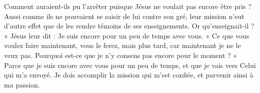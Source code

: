 Comment auraient-ils pu l’arrêter puisque Jésus ne voulait pas encore être pris ? Aussi comme ils ne pouvaient se saisir de lui contre son gré, leur mission n’eut d’autre effet que de les rendre témoins de ses enseignements. Or qu’enseignait-il ? « Jésus leur dit : Je suis encore pour un peu de temps avec vous. » Ce que vous voulez faire maintenant, vous le ferez, mais plus tard, car maintenant je ne le veux pas. Pourquoi est-ce que je n’y consens pas encore pour le moment ? « Parce que je suis encore avec vous pour un peu de temps, et que je vais vers Celui qui m’a envoyé. Je dois accomplir la mission qui m’est confiée, et parvenir ainsi à ma passion.